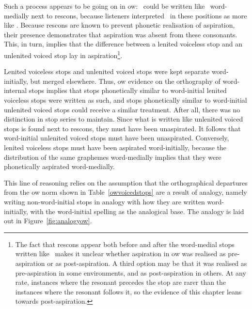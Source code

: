 Such a process appears to be going on in \gls{ow}: \lT\  could be written like \xD\ word-medially next to \gls{rescon}s, because listeners interpreted \lT\ in these positions as more like \xD. Because \gls{rescon}s are known to prevent phonetic realisation of aspiration, their presence demonstrates that  aspiration was absent from these consonants. This, in turn, implies that the difference between a lenited voiceless stop and an unlenited voiced stop lay in aspiration\footnote{The fact that \gls{rescon}s appear both before and after the word-medial stops written like \xD\ makes it unclear whether  aspiration in \gls{ow} was realised as pre-aspiration or as  post-aspiration. A third option may be that it was realised as pre-aspiration in some environments, and as post-aspiration in others. At any rate, instances where the resonant precedes the stop are rarer than the instances where the resonant follows it, so the evidence of this chapter leans towards post-aspiration.}.

Lenited voiceless stops and unlenited voiced stops were kept separate word-initially, but merged elsewhere. Thus, \gls{ow} evidence on the orthography of word-internal stops implies that stops phonetically similar to word-initial lenited voiceless stops were written as such, and stops phonetically similar to word-initial unlenited voiced stops could receive a similar treatment. After all, there was no distinction in stop series to maintain. Since what is written like unlenited voiced stops is found next to \gls{rescon}s, they must have been unaspirated. It follows that word-initial unlenited voiced stops must have been unaspirated. Conversely, lenited voiceless stops must have been aspirated  word-initially, because the distribution of the same graphemes word-medially implies that they were phonetically aspirated word-medially.

This line of reasoning relies on the assumption that the orthographical departures from the \gls{ow} norm shown in Table~\ref{owvoicedstops} are a result of analogy, namely writing non-word-initial stops in analogy with how they are written word-initially, with the word-initial spelling as the analogical base. The analogy is laid out in Figure~\ref{fig:analogyow}.

